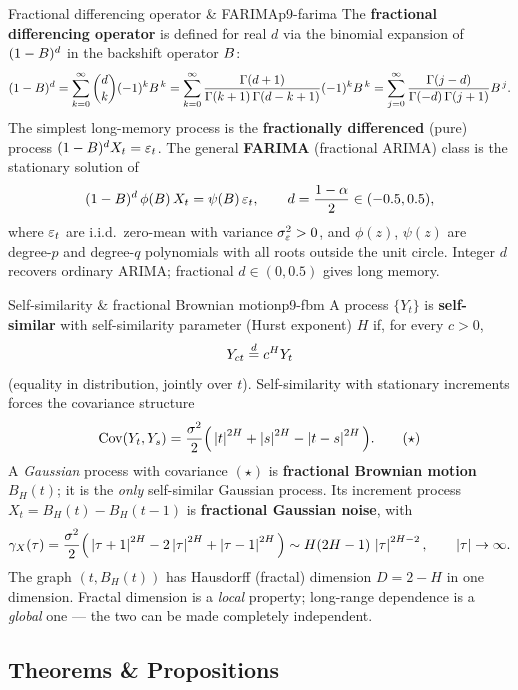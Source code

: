 \begin{definition}{Fractional differencing operator \& FARIMA}{p9-farima}
The \textbf{fractional differencing operator} is defined for real $d$ via the
binomial expansion of $(1-B)^d$ in the backshift operator $B$:
\[
(1-B)^d
= \sum_{k=0}^{\infty}\binom{d}{k}(-1)^k B^{\,k}
= \sum_{k=0}^{\infty}\frac{\Gamma(d+1)}{\Gamma(k+1)\,\Gamma(d-k+1)}(-1)^k B^{\,k}
= \sum_{j=0}^{\infty}\frac{\Gamma(j-d)}{\Gamma(-d)\,\Gamma(j+1)}B^{\,j}.
\]
The simplest long-memory process is the \textbf{fractionally differenced} (pure)
process $(1-B)^d X_t=\varepsilon_t$. The general \textbf{FARIMA} (fractional ARIMA)
class is the stationary solution of
\[
(1-B)^d\,\phi(B)\,X_t = \psi(B)\,\varepsilon_t,
\qquad d=\frac{1-\alpha}{2}\in(-0.5,0.5),
\]
where $\varepsilon_t$ are i.i.d.\ zero-mean with variance $\sigma_\varepsilon^2>0$, and
$\phi(z)$, $\psi(z)$ are degree-$p$ and degree-$q$ polynomials with all roots
outside the unit circle. Integer $d$ recovers ordinary ARIMA; fractional
$d\in(0,0.5)$ gives long memory.
\end{definition}

\begin{definition}{Self-similarity \& fractional Brownian motion}{p9-fbm}
A process $\{Y_t\}$ is \textbf{self-similar} with self-similarity parameter
(Hurst exponent) $H$ if, for every $c>0$,
\[
Y_{ct} \overset{d}{=} c^{H} Y_t
\]
(equality in distribution, jointly over $t$). Self-similarity with stationary
increments forces the covariance structure
\[
\operatorname{Cov}(Y_t,Y_s) = \frac{\sigma^2}{2}\Big(\left\lvert t \right\rvert^{2H}+\left\lvert s \right\rvert^{2H}-\left\lvert t-s \right\rvert^{2H}\Big).
\tag{$\star$}
\]
A \emph{Gaussian} process with covariance $(\star)$ is \textbf{fractional
Brownian motion} $B_H(t)$; it is the \emph{only} self-similar Gaussian process.
Its increment process $X_t=B_H(t)-B_H(t-1)$ is \textbf{fractional Gaussian
noise}, with
\[
\gamma_X(\tau)=\frac{\sigma^2}{2}\Big(\left\lvert \tau+1 \right\rvert^{2H}-2\left\lvert \tau \right\rvert^{2H}+\left\lvert \tau-1 \right\rvert^{2H}\Big)
\sim H(2H-1)\,\left\lvert \tau \right\rvert^{2H-2},\qquad\left\lvert \tau \right\rvert\to\infty .
\]
The graph $(t,B_H(t))$ has Hausdorff (fractal) dimension $D=2-H$ in one
dimension. Fractal dimension is a \emph{local} property; long-range dependence
is a \emph{global} one --- the two can be made completely independent.
\end{definition}

\subsection{Theorems \& Propositions}

